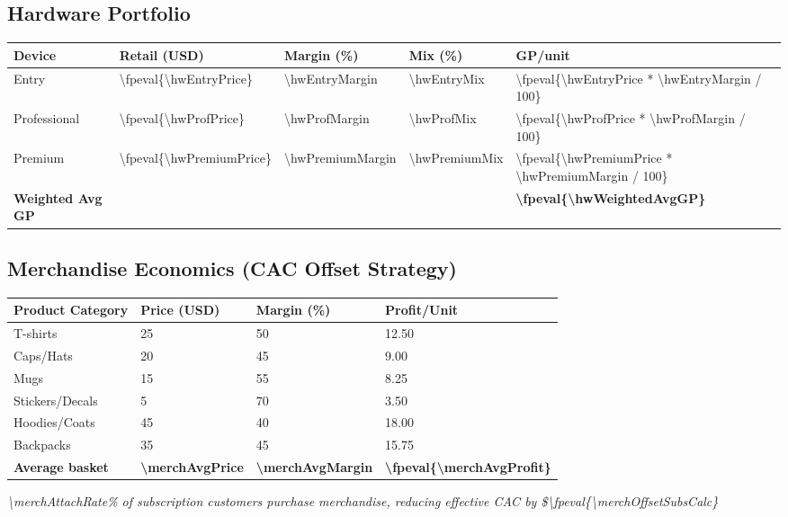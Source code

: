\documentclass[11pt]{article}
\newcommand{\numfpeval}[1]{\num{\fpeval{#1}}}
\newcommand{\numint}[1]{\num[round-precision=0]{\fpeval{#1}}}
\begin{document}
\subsection{Hardware Portfolio}
\begin{table}[H]
\centering
\begin{tabularx}{\linewidth}{l Y Y Y Y}
\toprule
Device & Retail (USD) & Margin (\%)\cite{industrybenchmark2024} & Mix (\%) & GP/unit \\\midrule
Entry        & \numint{\hwEntryPrice}  & \num{\hwEntryMargin} & \num{\hwEntryMix} & \numint{\hwEntryPrice * \hwEntryMargin / 100} \\
Professional & \numint{\hwProfPrice} & \num{\hwProfMargin} & \num{\hwProfMix} & \numint{\hwProfPrice * \hwProfMargin / 100} \\
Premium      & \numint{\hwPremiumPrice} & \num{\hwPremiumMargin} & \num{\hwPremiumMix} & \numint{\hwPremiumPrice * \hwPremiumMargin / 100} \\\midrule
\textbf{Weighted Avg GP} &  &  &  & \textbf{\numint{\hwWeightedAvgGP}} \\
\bottomrule
\end{tabularx}
\end{table}

\subsection{Merchandise Economics (CAC Offset Strategy)}
\begin{table}[H]
\centering
\begin{tabularx}{\linewidth}{l Y Y Y}
\toprule
Product Category & Price (USD) & Margin (\%)\cite{printful2023} & Profit/Unit \\\midrule
T-shirts & \num{25} & \num{50} & \num{12.50} \\
Caps/Hats & \num{20} & \num{45} & \num{9.00} \\
Mugs & \num{15} & \num{55} & \num{8.25} \\
Stickers/Decals & \num{5} & \num{70} & \num{3.50} \\
Hoodies/Coats & \num{45} & \num{40} & \num{18.00} \\
Backpacks & \num{35} & \num{45} & \num{15.75} \\\midrule
\textbf{Average basket} & \textbf{\num{\merchAvgPrice}} & \textbf{\num{\merchAvgMargin}} & \textbf{\numfpeval{\merchAvgProfit}} \\
\bottomrule
\end{tabularx}
\end{table}
\textit{\num{\merchAttachRate}\% of subscription customers purchase merchandise, reducing effective CAC by \$\numfpeval{\merchOffsetSubsCalc}}\cite{shopify2024}
\end{document}
